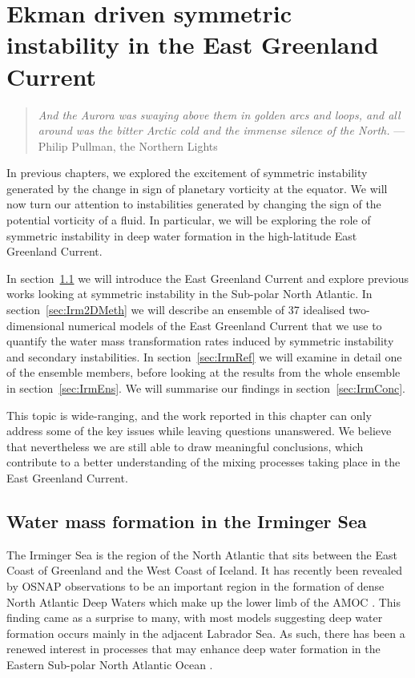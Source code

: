 \chapter{Ekman driven symmetric instability in the East Greenland Current}
\label{chap:5}
\begin{quote}
     \textit{And the Aurora was swaying above them in golden arcs and loops, and all around was the bitter Arctic cold and the immense silence of the North.} --- Philip Pullman, the Northern Lights
\end{quote}

In previous chapters, we explored the excitement of symmetric instability generated by the change in sign of planetary vorticity at the equator. We will now turn our attention to instabilities generated by changing the sign of the potential vorticity of a fluid. In particular, we will be exploring the role of symmetric instability in deep water formation in the high-latitude East Greenland Current.

In section~\ref{sec:IrmIntro} we will introduce the East Greenland Current and explore previous works looking at symmetric instability in the Sub-polar North Atlantic. In section~\ref{sec:Irm2DMeth} we will describe an ensemble of 37 idealised two-dimensional numerical models of the East Greenland Current that we use to quantify the water mass transformation rates induced by symmetric instability and secondary instabilities. In section~\ref{sec:IrmRef} we will examine in detail one of the ensemble members, before looking at the results from the whole ensemble in section~\ref{sec:IrmEns}. We will summarise our findings in section~\ref{sec:IrmConc}.

This topic is wide-ranging, and the work reported in this chapter can only address some of the key issues while leaving questions unanswered. We believe that nevertheless we are still able to draw meaningful conclusions, which contribute to a better understanding of the mixing processes taking place in the East Greenland Current.

\section{Water mass formation in the Irminger Sea}
\label{sec:IrmIntro}
The Irminger Sea is the region of the North Atlantic that sits between the East Coast of Greenland and the West Coast of Iceland. It has recently been revealed by OSNAP observations to be an important region in the formation of dense North Atlantic Deep Waters which make up the lower limb of the AMOC \citep{Lozier2019}. This finding came as a surprise to many, with most models suggesting deep water formation occurs mainly in the adjacent Labrador Sea. As such, there has been a renewed interest in processes that may enhance deep water formation in the Eastern Sub-polar North Atlantic Ocean \citep[e.g.][]{DeJong2016, Josey2019, LeBras2022}.

